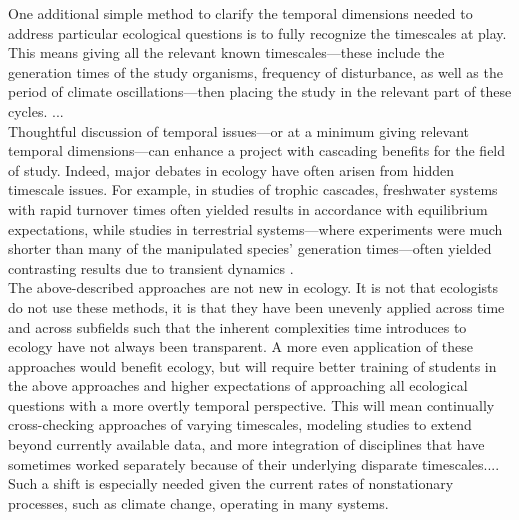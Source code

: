 \documentclass[11pt,a4paper,oneside]{article}
\begin{document}
One additional simple method to clarify the temporal dimensions needed to address particular ecological questions is to fully recognize the timescales at play. This means giving all the relevant known timescales---these include the generation times of the study organisms, frequency of disturbance, as well as the period of climate oscillations---then placing the study in the relevant part of these cycles. ...\\

Thoughtful discussion of temporal issues---or at a minimum giving relevant temporal dimensions---can enhance a project with cascading benefits for the field of study. Indeed, major debates in ecology have often arisen from hidden timescale issues. For example, in studies of trophic cascades, freshwater systems with rapid turnover times often yielded results in accordance with equilibrium expectations, while studies in terrestrial systems---where experiments were much shorter than many of the manipulated species' generation times---often yielded contrasting results due to transient dynamics \citep{Cebrian:2009hg}.\\ 

The above-described approaches are not new in ecology. It is not that ecologists do not use these methods, it is that they have been unevenly applied across time and across subfields such that the inherent complexities time introduces to ecology have not always been transparent. A more even application of these approaches would benefit ecology, but will require better training of students in the above approaches and higher expectations of approaching all ecological questions with a more overtly temporal perspective. This will mean continually cross-checking approaches of varying timescales, modeling studies to extend beyond currently available data, and more integration of disciplines that have sometimes worked separately because of their underlying disparate timescales.... Such a shift is especially needed given the current rates of nonstationary processes, such as climate change, operating in many systems. \\
\end{document}
